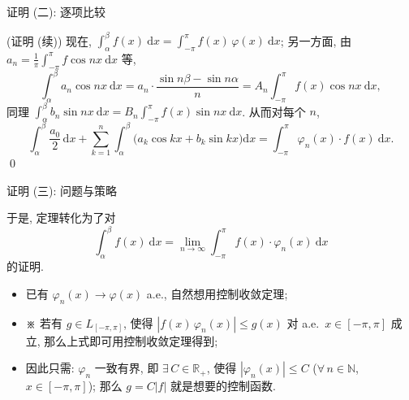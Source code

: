 \begin{frame}{证明 (二): 逐项比较}

\startproof[bg=yellow, fg=red](证明 (续))
现在, $\int_{\alpha}^{\beta} f(x) ~ \mathrm{d} x = \int_{-\pi}^{\pi} f(x)\, \varphi(x) ~ \mathrm{d} x$;
另一方面, 由 $a_n = \frac{1}{\pi} \int_{-\pi}^{\pi} f \cos nx ~ \mathrm{d} x$ 等,
\[
\int_{\alpha}^{\beta} a_n \cos nx ~ \mathrm{d} x
= a_n \cdot \frac{\sin n\beta - \sin n\alpha}{n}
= A_n \int_{-\pi}^{\pi} f(x) \cos nx ~ \mathrm{d} x ,
\]
同理 $\int_{\alpha}^{\beta} b_n \sin nx ~ \mathrm{d} x
= B_n \int_{-\pi}^{\pi} f(x) \sin nx ~ \mathrm{d} x$. 从而对每个 $n$,
\[
\int_{\alpha}^{\beta} \frac{a_0}{2}\, \mathrm{d} x
+ \sum_{k=1}^{n} \int_{\alpha}^{\beta}
\big( a_k \cos kx + b_k \sin kx \big) \mathrm{d} x
= \int_{-\pi}^{\pi} \varphi_n(x) \cdot f(x) ~ \mathrm{d} x .
\]
\qed

\end{frame}


\begin{frame}{证明 (三): 问题与策略}

于是, 定理转化为了对
\[
\int_{\alpha}^{\beta} f(x) ~ \mathrm{d} x
= \lim_{n \to \infty} \int_{-\pi}^{\pi} f(x) \cdot \varphi_n(x) ~ \mathrm{d} x
\]
的证明.

\pause

\begin{itemize}
\item 已有 $\varphi_n(x) \to \varphi(x)$ a.e., 自然想用\alert{控制收敛定理};
\item \textbf{※} 若有 $g \in L_{[-\pi, \pi]}$, 使得
  $|f(x)\, \varphi_n(x)| \leqslant g(x)$ 对 a.e.\ $x \in [-\pi, \pi]$ 成立,
  那么上式即可用控制收敛定理得到;
\item 因此只需: $\varphi_n$ \alert{一致有界}, 即 $\exists\, C \in \mathbb{R}_+$, 使得
  $|\varphi_n(x)| \leqslant C$ ($\forall\, n \in \mathbb{N}$, $x \in [-\pi, \pi]$);
  那么 $g = C|f|$ 就是想要的控制函数.
\end{itemize}

\end{frame}


